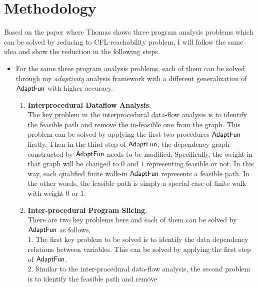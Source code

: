\section{Methodology}
\label{subsec:cfl-methodology}
Based on the paper\cite{Reps98} where Thomas shows 
three program analysis problems 
which can be solved by reducing to CFL-reachability problem, I will follow the same idea and show the reduction
in the following steps.
\begin{itemize}
 \item For the same three program analysis problems, each of them 
 can be solved through my \emph{adaptivity} analysis framework with 
 a different generalization of $\textsf{AdaptFun}$ with higher accuracy.
 \begin{enumerate}
    \item \textbf{Interprocedural Dataflow Analysis}.
    \\
The key problem in the interprocedural data-flow analysis is to identify the feasible path and remove 
the in-feasible one from the graph.
This problem can be solved by applying the first two procedures $\textsf{AdaptFun}$ firstly.
Then in the third step of  $\textsf{AdaptFun}$, the dependency graph constructed by $\textsf{AdaptFun}$ needs to be modified.
Specifically, the weight in that graph will be changed to $0$ and $1$ 
representing feasible or not. 
In this way, each qualified finite walk-in 
$\textsf{AdaptFun}$ represents a feasible path.
In the other words, the feasible path is simply a special case of finite walk 
with weight $0$ or $1$.
\item \textbf{Inter-procedural Program Slicing}.
\\
There are two key problems here and each of them can be solved by $\textsf{AdaptFun}$ as follows,
\\ 
1. The first key problem to be solved is to identify the data dependency relations between variables. 
This can be solved by applying the first step of $\textsf{AdaptFun}$.
\\
2. Similar to the inter-procedural data-flow analysis, 
the second problem is to identify the feasible path and remove 

\end{enumerate}
\end{itemize}
